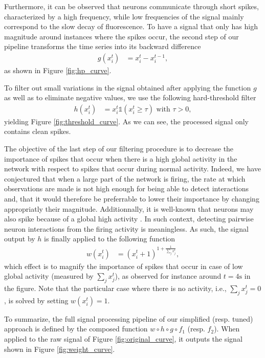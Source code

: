 \documentclass[wcp]{jmlr}
\begin{document}
Furthermore, it can be observed that neurons communicate through short spikes, characterized by a high
frequency, while low frequencies of the signal mainly correspond to the slow
decay of fluorescence. To have a signal that only has high magnitude around instances where the spikes occur, the second step of our pipeline transforms the time series into its backward
difference
\begin{align}
g(x^{t}_{i}) &= x^{t}_i - x^{t-1}_i \label{eq:high-pass-filter},
\end{align}
as shown in Figure \ref{fig:hp_curve}.

To filter out small variations in the signal obtained after applying the
function $g$ as well as to eliminate negative values, we use the following
hard-threshold filter
\begin{align}
h(x^{t}_i) &= x^{t}_i \mathbb{1}(x^{t}_i \geq \tau) \text{ with } \tau > 0,
\end{align}
yielding Figure \ref{fig:threshold_curve}.
As we can see, the processed signal only contains clean spikes.

The objective of the last step of our filtering procedure is to decrease the
importance of spikes that occur when there is a high global activity in the
network with respect to  spikes that occur during normal activity. Indeed, we
have conjectured that when a large part of the network is firing, the rate at
which observations are made is not high enough for being able to detect
interactions and, that it would therefore be preferrable to lower their
importance by changing appropriatly their magnitude. Additionnally, it is
well-known that neurons may also spike because of a global high activity
\citep{stetter2012model}. In such  context, detecting pairwise neuron
interactions from the firing activity is meaningless. As such,
the signal output by $h$ is finally applied to the following function
\begin{align}
 w(x^{t}_i) &= (x^{t}_i + 1 )^{1 + \frac{1}{\sum_{j} x^{t}_j}},
\end{align}
which effect is to magnify the importance of spikes that occur in case of low global activity (measured by $\sum_{j} x^{t}_j$), as observed for instance around $t=4\text{s}$ in the figure.
Note that the particular case where there is no activity, i.e., $\sum_{j} x^{t}_j = 0$, is solved by setting $w(x^{t}_i) = 1$. 


To summarize, the full signal processing pipeline of our simplified (resp.
tuned) approach is defined by the composed function $w \circ h \circ g \circ
f_1$ (resp. $f_2$). When applied to the raw signal of Figure
\ref{fig:original_curve}, it outputs the signal shown in Figure
\ref{fig:weight_curve}.
\end{document}
